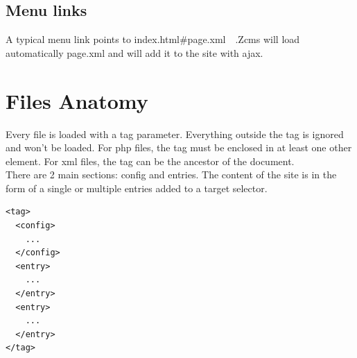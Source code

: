 \documentclass[a4paper,12pt]{article}
\begin{document}
\subsection{Menu links}
A typical menu link points to index.html\#page.xml\ \ .Zcms will load automatically page.xml and will add it to the site with ajax.
\section{Files Anatomy}
Every file is loaded with a tag parameter. Everything outside the tag is ignored and won't be loaded. For php files, the tag must be enclosed in at least one other element. For xml files, the tag can be the ancestor of the document.\\
There are 2 main sections: config and entries. The content of the site is in the form of a single or multiple entries added to a target selector.\\
\footnotesize
\begin{verbatim}
<tag>
  <config>
    ...
  </config>
  <entry>
    ...
  </entry>
  <entry>
    ...
  </entry>
</tag>
\end{verbatim}
\normalsize
\end{document}
